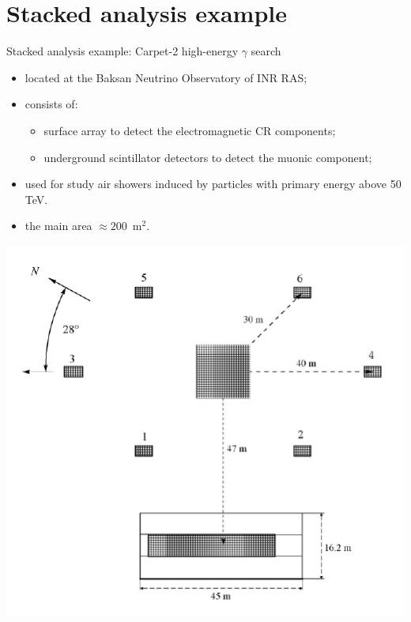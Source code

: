 \section{Stacked analysis example}

\begin{frame}{Stacked analysis example: Carpet-2 high-energy $\gamma$ search}
    \begin{itemize}
        \item located at the Baksan Neutrino Observatory of INR RAS;
    \end{itemize}
    \vspace{-0.3em}
    \begin{minipage}[c]{0.5\textwidth}
        \begin{itemize}
            \item consists of:
            \begin{itemize}
            \item surface array to detect the electromagnetic CR components;
            \item underground scintillator detectors to detect the muonic component;
            \end{itemize}
            \item used for study air showers induced by particles with primary energy above 50 TeV.
            \item the main area $\approx 200$~m$^2$.
        \end{itemize}
    \end{minipage}
    \hfill
    \begin{minipage}[c]{0.49\textwidth}
        \includegraphics[width=1\textwidth]{pics/CarpetLayout.pdf}
    \end{minipage}
\end{frame}

